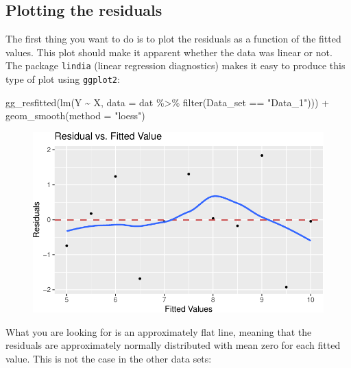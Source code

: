 \documentclass[
  letterpaper,
  DIV=11,
  numbers=noendperiod]{scrreprt}
\newenvironment{Shaded}{\begin{snugshade}}{\end{snugshade}}
\newcommand{\AttributeTok}[1]{\textcolor[rgb]{0.40,0.45,0.13}{#1}}
\newcommand{\FunctionTok}[1]{\textcolor[rgb]{0.28,0.35,0.67}{#1}}
\newcommand{\NormalTok}[1]{\textcolor[rgb]{0.00,0.23,0.31}{#1}}
\newcommand{\SpecialCharTok}[1]{\textcolor[rgb]{0.37,0.37,0.37}{#1}}
\newcommand{\StringTok}[1]{\textcolor[rgb]{0.13,0.47,0.30}{#1}}
\begin{document}
\hypertarget{plotting-the-residuals}{%
\subsection{Plotting the residuals}\label{plotting-the-residuals}}

The first thing you want to do is to plot the residuals as a function of
the fitted values. This plot should make it apparent whether the data
was linear or not. The package \texttt{lindia} (linear regression
diagnostics) makes it easy to produce this type of plot using
\texttt{ggplot2}:

\begin{Shaded}
\begin{Highlighting}[]
\FunctionTok{gg\_resfitted}\NormalTok{(}\FunctionTok{lm}\NormalTok{(Y }\SpecialCharTok{\textasciitilde{}}\NormalTok{ X, }\AttributeTok{data =}\NormalTok{ dat }\SpecialCharTok{\%\textgreater{}\%} \FunctionTok{filter}\NormalTok{(Data\_set }\SpecialCharTok{==} \StringTok{"Data\_1"}\NormalTok{))) }\SpecialCharTok{+} \FunctionTok{geom\_smooth}\NormalTok{(}\AttributeTok{method =} \StringTok{"loess"}\NormalTok{)}
\end{Highlighting}
\end{Shaded}

\begin{figure}[H]

{\centering \includegraphics{./08-linearreg_files/figure-pdf/unnamed-chunk-25-1.pdf}

}

\end{figure}

What you are looking for is an approximately flat line, meaning that the
residuals are approximately normally distributed with mean zero for each
fitted value. This is not the case in the other data sets:
\end{document}
